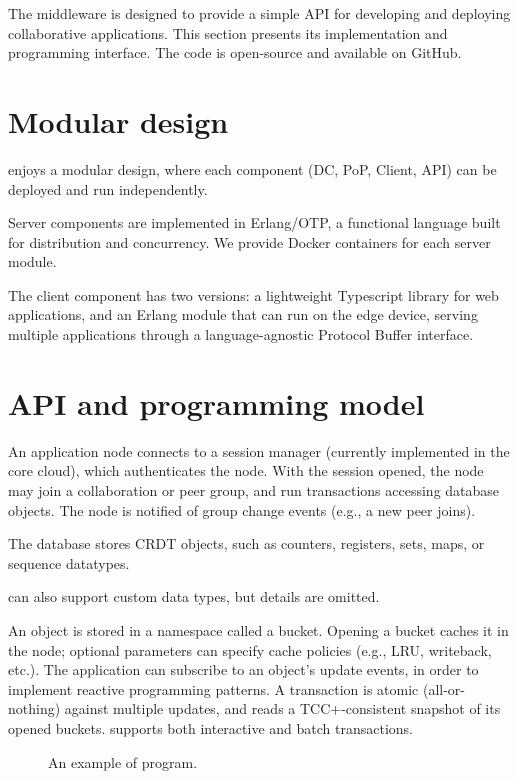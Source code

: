 
The \system{} middleware is designed to provide a simple API for developing and deploying collaborative applications.
This section presents its implementation and programming interface.
The code is open-source and available on GitHub.%


\section{Modular design}
\label{sec:modular-design}

\system{} enjoys a modular design, where each component (DC,
PoP, Client, API) can be deployed and run independently.

Server components are implemented in Erlang/OTP, a functional language
built for distribution and concurrency. We provide Docker containers
for each server module.

The client component has two versions: a lightweight Typescript
library for web applications, and an Erlang module that can run on the
edge device, serving multiple applications through a language-agnostic
Protocol Buffer interface.

\section{API and programming model}
  
An application node connects to a session manager (currently implemented
in  the core cloud), which authenticates the node.
With the session opened, the node may join a collaboration or peer group,
and run transactions accessing database objects.
The node is notified of group change events (e.g., a new peer joins).

The database stores CRDT objects, such as counters, registers, sets,
maps, or sequence datatypes.

\system{} can also support custom data types, but details are omitted.

An object is stored in a namespace called a bucket.
Opening a bucket caches it in the node; optional parameters can specify
cache policies (e.g., LRU, writeback, etc.).
The application can subscribe to an object's update events, in order to
implement reactive programming patterns.
A transaction is atomic (all-or-nothing) against multiple updates, and
reads a  TCC+-consistent snapshot of its opened buckets.
\system{} supports both interactive and batch transactions.

\begin{figure}[th]
  
  \caption{
    An example of \system{} program.
  }
\end{figure}

